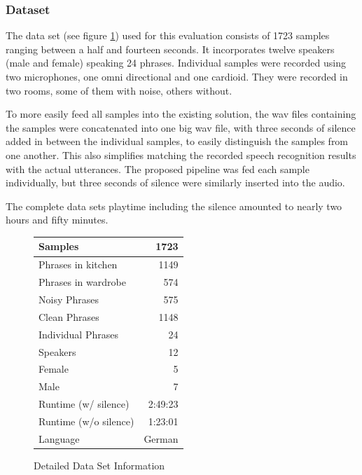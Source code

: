 \subsubsection{Dataset}
\label{eval:dataset:dataset}

The data set (see figure \ref{table:eval_dataset_info}) used for this evaluation consists of 1723 samples ranging between a half and fourteen seconds.
It incorporates twelve speakers (male and female) speaking 24 phrases. 
Individual samples were recorded using two microphones, one omni directional and one cardioid.
They were recorded in two rooms, some of them with noise, others without.

To more easily feed all samples into the existing solution, the wav files containing the samples were concatenated into one big wav file, with three seconds of silence added in between the individual samples, to easily distinguish the samples from one another.
This also simplifies matching the recorded speech recognition results with the actual utterances.
The proposed pipeline was fed each sample individually, but three seconds of silence were similarly inserted into the audio.

The complete data sets playtime including the silence amounted to nearly two hours and fifty minutes.


\begin{figure}[]
	\centering
	\begin{tabular}{| l | r |}
		\hline
		Samples 				& 1723	 	\\ \hline
		Phrases	in kitchen		& 1149		\\ \hline
		Phrases	in wardrobe		& 574		\\ \hline
		Noisy Phrases			& 575		\\ \hline
		Clean Phrases			& 1148		\\ \hline
		Individual Phrases		& 24 		\\ \hline
		Speakers 				& 12	 	\\ \hline
		Female					& 5 		\\ \hline
		Male	 				& 7			\\ \hline
		Runtime (w/ silence) 	& 2:49:23	\\ \hline
		Runtime (w/o silence) 	& 1:23:01	\\ \hline
		Language 				& German	\\ \hline
	\end{tabular}
	\caption{Detailed Data Set Information}
	\label{table:eval_dataset_info}
\end{figure}

